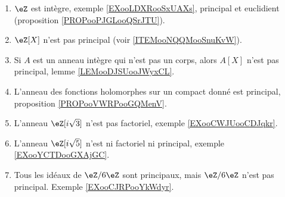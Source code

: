 
\begin{enumerate}
    \item
        \( \eZ\) est intègre, exemple \ref{EXooLDXRooSxUAXs}, principal et euclidient (proposition \ref{PROPooPJGLooQSrJTU}).
    \item
        \( \eZ[X]\) n'est pas principal (voir \ref{ITEMooNQQMooSnuKvW}).
    \item   \label{ITEMooNQQMooSnuKvW}
        Si \( A\) est un anneau intègre qui n'est pas un corps, alors \( A[X]\) n'est pas principal, lemme \ref{LEMooDJSUooJWyxCL}.
    \item
        L'anneau des fonctions holomorphes sur un compact donné est principal, proposition \ref{PROPooVWRPooGQMenV}.
    \item
        L'anneau \( \eZ[i\sqrt{ 3 }]\) n'est pas factoriel, exemple \ref{EXooCWJUooCDJqkr}.
    \item 
        L'anneau \( \eZ[i\sqrt{ 5 }]\) n'est ni factoriel ni principal, exemple \ref{EXooYCTDooGXAjGC}.
    \item
        Tous les idéaux de \( \eZ/6\eZ\) sont principaux, mais \( \eZ/6\eZ\) n'est pas principal. Exemple \ref{EXooCJRPooYkWdyr}.
\end{enumerate}

